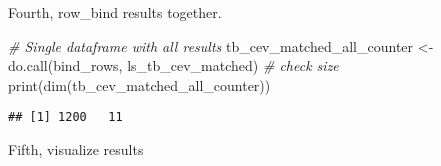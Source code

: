 \documentclass[
]{article}
\newenvironment{Shaded}{\begin{snugshade}}{\end{snugshade}}
\newcommand{\CommentTok}[1]{\textcolor[rgb]{0.56,0.35,0.01}{\textit{#1}}}
\newcommand{\FunctionTok}[1]{\textcolor[rgb]{0.00,0.00,0.00}{#1}}
\newcommand{\NormalTok}[1]{#1}
\newcommand{\OtherTok}[1]{\textcolor[rgb]{0.56,0.35,0.01}{#1}}
\begin{document}
Fourth, row\_bind results together.

\begin{Shaded}
\begin{Highlighting}[]
\CommentTok{\# Single dataframe with all results}
\NormalTok{tb\_cev\_matched\_all\_counter }\OtherTok{\textless{}{-}} \FunctionTok{do.call}\NormalTok{(bind\_rows, ls\_tb\_cev\_matched)}
\CommentTok{\# check size}
\FunctionTok{print}\NormalTok{(}\FunctionTok{dim}\NormalTok{(tb\_cev\_matched\_all\_counter))}
\end{Highlighting}
\end{Shaded}

\begin{verbatim}
## [1] 1200   11
\end{verbatim}

Fifth, visualize results
\end{document}
